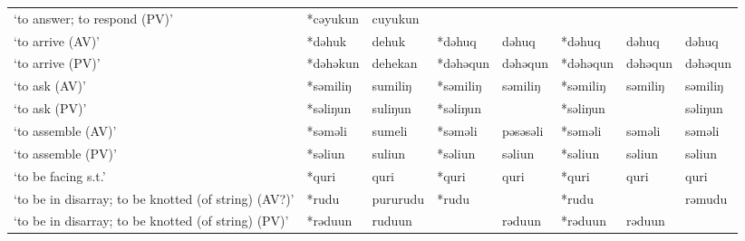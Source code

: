 \begin{landscape}
\begin{longtable}[c]{@{}p{3cm}<{\raggedright}p{2.75cm}<{\raggedright}p{2.75cm}<{\raggedright}p{2.75cm}<{\raggedright}p{2.75cm}<{\raggedright}p{2.75cm}<{\raggedright}p{2.75cm}<{\raggedright}p{2.75cm}<{\raggedright}@{}}
`to answer; to respond (PV)'                         & *cəyukun           & cuyukun                        &                    &                            &                  &                          &                                   \\
`to arrive (AV)'                                     & *dəhuk             & dehuk                          & *dəhuq             & dəhuq                      & *dəhuq           & dəhuq                    & dəhuq                             \\
`to arrive (PV)'                                     & *dəhəkun           & dehekan                        & *dəhəqun           & dəhəqun                    & *dəhəqun         & dəhəqun                  & dəhəqun                           \\
`to ask (AV)'                                        & *səmiliŋ           & sumiliŋ                        & *səmiliŋ           & səmiliŋ                    & *səmiliŋ         & səmiliŋ                  & səmiliŋ                           \\
`to ask (PV)'                                        & *səliŋun           & suliŋun                        & *səliŋun           &                            & *səliŋun         &                          & səliŋun                           \\
`to assemble (AV)'                                   & *səməli            & sumeli                         & *səməli            & pəsəsəli                   & *səməli          & səməli                   & səməli                            \\
`to assemble (PV)'                                   & *səliun            & suliun                         & *səliun            & səliun                     & *səliun          & səliun                   & səliun                            \\
`to be facing s.t.'                                  & *quri              & quri                           & *quri              & quri                       & *quri            & quri                     & quri                              \\
`to be in disarray; to be knotted (of string) (AV?)' & *rudu              & pururudu                       & *rudu              &                            & *rudu            &                          & rəmudu                            \\
`to be in disarray; to be knotted (of string) (PV)'  & *rəduun            & ruduun                         &                    & rəduun                     & *rəduun          & rəduun                   &                                   \\

\end{longtable}
\end{landscape}
